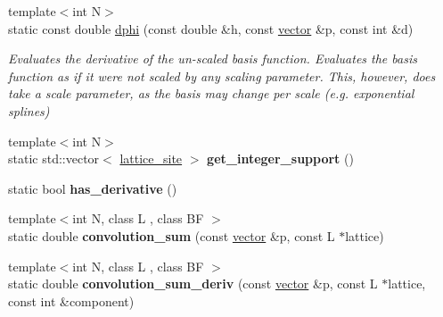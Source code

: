 \begin{DoxyCompactItemize}
\mbox{\label{classsisl_1_1nearest__neighbor_a7adbe25f4f09abbd366053c673a8e716}} 
{\footnotesize template$<$int N$>$ }\\static const double \hyperlink{classsisl_1_1nearest__neighbor_a7adbe25f4f09abbd366053c673a8e716}{dphi} (const double \&h, const \hyperlink{namespacesisl_a2069bd5374a9be042ff3ce3306d41e1a}{vector} \&p, const int \&d)
\begin{DoxyCompactList}\small\item\em Evaluates the derivative of the un-\/scaled basis function. Evaluates the basis function as if it were not scaled by any scaling parameter. This, however, does take a scale parameter, as the basis may change per scale (e.\+g. exponential splines) \end{DoxyCompactList}\item 
\mbox{\label{classsisl_1_1nearest__neighbor_ad71cd45c3d0e315b2abe2f14dbd374b3}} 
{\footnotesize template$<$int N$>$ }\\static std\+::vector$<$ \hyperlink{namespacesisl_acd18feee4026583db6185df2b25434aa}{lattice\+\_\+site} $>$ {\bfseries get\+\_\+integer\+\_\+support} ()
\item 
\mbox{\label{classsisl_1_1nearest__neighbor_ac1c8bef20acdb2ef8a457d4e7a3176cd}} 
static bool {\bfseries has\+\_\+derivative} ()
\item 
\mbox{\label{classsisl_1_1nearest__neighbor_a00058ae6c642d6a1a64d7e21db24bdab}} 
{\footnotesize template$<$int N, class L , class BF $>$ }\\static double {\bfseries convolution\+\_\+sum} (const \hyperlink{namespacesisl_a2069bd5374a9be042ff3ce3306d41e1a}{vector} \&p, const L $\ast$lattice)
\item 
\mbox{\label{classsisl_1_1nearest__neighbor_ae846be683699e686abc143008a072b95}} 
{\footnotesize template$<$int N, class L , class BF $>$ }\\static double {\bfseries convolution\+\_\+sum\+\_\+deriv} (const \hyperlink{namespacesisl_a2069bd5374a9be042ff3ce3306d41e1a}{vector} \&p, const L $\ast$lattice, const int \&component)
\item 
\mbox{\label{classsisl_1_1nearest__neighbor_aa765cd2944d9d5262c8f3f8c10a0dca1}} 

\end{DoxyCompactItemize}
